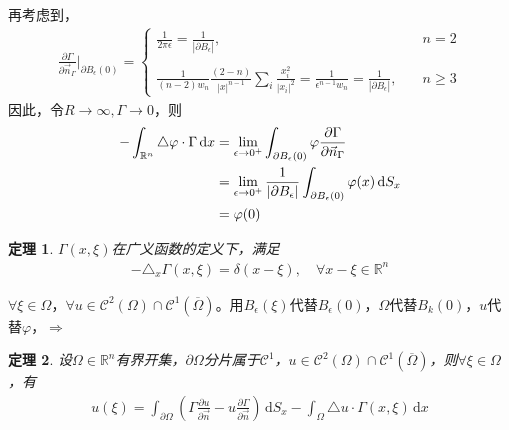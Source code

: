 \documentclass[11pt, a4paper]{article}
\theoremstyle{theorem}
\newtheorem{thm}{定理}[section]
\newcommand{\intd}[1]{\,\mathrm{d}{#1}}
\begin{document}
再考虑到，
\begin{align*}
    \frac{\partial \Gamma}{\partial \vec{n}_\Gamma}  \bigg|_{\partial B_\epsilon(0)} =
    \begin{cases}
        \displaystyle \frac{1}{2\pi \epsilon} = \frac{1}{|\partial B_\epsilon|}, \quad &n = 2 \\
          \\
        \displaystyle\frac{1}{(n-2)w_n} \frac{(2-n)}{|x|^{n-1}} \sum_i \frac{x_i^2}{|x_i|^2} = \frac{1}{\epsilon^{n-1}w_n} = \frac{1}{|\partial B_\epsilon|}, \quad &n \geq 3
    \end{cases}
\end{align*}
因此，令$R \rightarrow \infty, \Gamma \rightarrow 0$，则
\begin{align}
    - \int_{\mathbb{R}^n} \triangle \varphi \cdot \Gamma \intd x
    &= \lim\limits_{\epsilon \rightarrow 0^+}\int_{\partial B_\epsilon(0)} \varphi \frac{\partial \Gamma}{\partial \vec{n}_\Gamma} \notag \\
    &= \lim\limits_{\epsilon \rightarrow 0^+} \frac{1}{|\partial B_\epsilon|} \int_{\partial B_\epsilon(0)} \varphi(x) \intd S_x \notag \\
    &= \varphi(0)
\end{align}

\begin{thm}
    $\Gamma(x,\xi)$在广义函数的定义下，满足
    \begin{align}
        - \triangle_x \Gamma(x,\xi) = \delta(x - \xi), \quad \forall x - \xi \in \mathbb{R}^n
    \end{align}
\end{thm}

$\forall \xi \in \Omega$，$\forall u \in \mathcal{C}^2(\Omega) \cap \mathcal{C}^1(\overline{\Omega})$。用$B_\epsilon(\xi)$代替$B_\epsilon(0)$，$\Omega$代替$B_k(0)$，$u$代替$\varphi$，$\Longrightarrow$

\begin{thm}
\label{thm5-1-4}
    设$\Omega \in \mathbb{R}^n$有界开集，$\partial \Omega$分片属于$\mathcal{C}^1$，$u \in \mathcal{C}^2(\Omega) \cap \mathcal{C}^1(\overline{\Omega})$，则$\forall \xi \in \Omega$，有
    \begin{align}
        u(\xi) = \int_{\partial \Omega} \left(\Gamma \frac{\partial u}{\partial \vec{n}} - u \frac{\partial \Gamma}{\partial \vec{n}}\right) \intd S_x - \int_\Omega \triangle u \cdot \Gamma(x, \xi) \intd x
    \end{align}
\end{thm}
\end{document}
